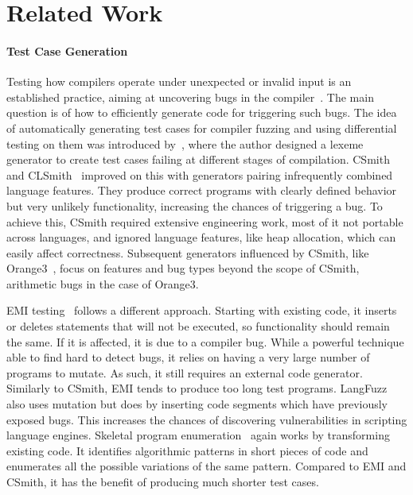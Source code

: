 \section{Related Work}\label{sec:rw}

\paragraph{Test Case Generation} 
Testing how compilers operate under unexpected or invalid input is an established practice, aiming at uncovering bugs in the compiler~\cite{Boujarwah1997}. The main question is of how to efficiently generate code for triggering such bugs. The idea of automatically generating test cases for compiler fuzzing and using differential testing on them was introduced by~\cite{McKeeman1998}, where the author designed a lexeme generator to create test cases failing at different stages of compilation. CSmith~\cite{Yang2011} and CLSmith~\cite{Lidbury2015a} improved on this with generators pairing infrequently combined language features. They produce correct programs with clearly defined behavior but very unlikely functionality, increasing the chances of triggering a bug. To achieve this, CSmith required extensive engineering work, most of it not portable across languages, and ignored language features, like heap allocation, which can easily affect correctness. Subsequent generators influenced by CSmith, like Orange3~\cite{Nagai2013}, focus on features and bug types beyond the scope of CSmith, arithmetic bugs in the case of Orange3.

EMI testing~\cite{Le2013a,Le2015,Sun2016a} follows a different approach. Starting with existing code, it inserts or deletes statements that will not be executed, so functionality should remain the same. If it is affected, it is due to a compiler bug. While a powerful technique able to find hard to detect bugs, it relies on having a very large number of programs to mutate. As such, it still requires an external code generator. Similarly to CSmith, EMI tends to produce too long test programs. LangFuzz~\cite{Holler2012} also uses mutation but does by inserting code segments which have previously exposed bugs. This increases the chances of discovering vulnerabilities in scripting language engines. Skeletal program enumeration~\cite{Zhang2017a} again works by transforming existing code. It identifies algorithmic patterns in short pieces of code and enumerates all the possible variations of the same pattern. Compared to EMI and CSmith, it has the benefit of producing much shorter test cases. 

